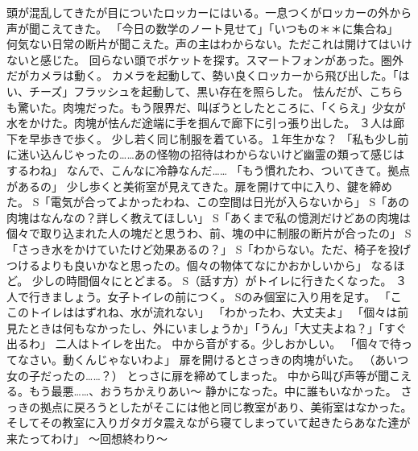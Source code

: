 \documentclass[uplatex]{utbook}
\begin{document}
頭が混乱してきたが目についたロッカーにはいる。一息つくがロッカーの外から声が聞こえてきた。
「今日の数学のノート見せて」「いつもの＊＊に集合ね」
何気ない日常の断片が聞こえた。声の主はわからない。ただこれは開けてはいけないと感じた。
回らない頭でポケットを探す。スマートフォンがあった。圏外だがカメラは動く。
カメラを起動して、勢い良くロッカーから飛び出した。「はい、チーズ」フラッシュを起動して、黒い存在を照らした。
怯んだが、こちらも驚いた。肉塊だった。もう限界だ、叫ぼうとしたところに、「くらえ」少女が水をかけた。肉塊が怯んだ途端に手を掴んで廊下に引っ張り出した。
３人は廊下を早歩きで歩く。
少し若く同じ制服を着ている。１年生かな？
「私も少し前に迷い込んじゃったの……あの怪物の招待はわからないけど幽霊の類って感じはするわね」
なんで、こんなに冷静なんだ……
「もう慣れたわ、ついてきて。拠点があるの」
少し歩くと美術室が見えてきた。扉を開けて中に入り、鍵を締めた。
S「電気が合ってよかったわね、この空間は日光が入らないから」
S「あの肉塊はなんなの？詳しく教えてほしい」
S「あくまで私の憶測だけどあの肉塊は個々で取り込まれた人の塊だと思うわ、前、塊の中に制服の断片が合ったの」
S「さっき水をかけていたけど効果あるの？」
S「わからない。ただ、椅子を投げつけるよりも良いかなと思ったの。個々の物体てなにかおかしいから」
なるほど。
少しの時間個々にとどまる。
S（話す方）がトイレに行きたくなった。
３人で行きましょう。女子トイレの前につく。
Sのみ個室に入り用を足す。
「ここのトイレははずれね、水が流れない」
「わかったわ、大丈夫よ」
「個々は前見たときは何もなかったし、外にいましょうか」「うん」「大丈夫よね？」「すぐ出るわ」
二人はトイレを出た。
中から音がする。少しおかしい。
「個々で待ってなさい。動くんじゃないわよ」
扉を開けるとさっきの肉塊がいた。
（あいつ女の子だったの……？）
とっさに扉を締めてしまった。
中から叫び声等が聞こえる。もう最悪……、おうちかえりあい〜
静かになった。中に誰もいなかった。
さっきの拠点に戻ろうとしたがそこには他と同じ教室があり、美術室はなかった。
そしてその教室に入りガタガタ震えながら寝てしまっていて起きたらあなた達が来たってわけ」
〜回想終わり〜
\end{document}
